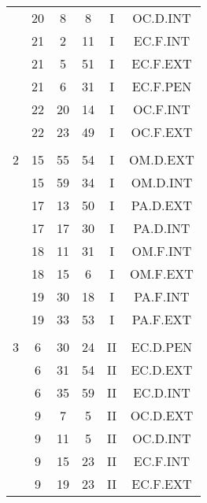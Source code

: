 \documentclass[12pt, a4paper]{article}
\begin{document}
\begin{multicols}{3}
{\begin{tabular}{c c c c c c}
	 	 	 	 & 20 & 8 & 8 & I & OC.D.INT\\%
	 	 	 	 & 21 & 2 & 11 & I & EC.F.INT\\%
	 	 	 	 & 21 & 5 & 51 & I & EC.F.EXT\\%
	 	 	 	 & 21 & 6 & 31 & I & EC.F.PEN\\%
	 	 	 	 & 22 & 20 & 14 & I & OC.F.INT\\%
	 	 	 	 & 22 & 23 & 49 & I & OC.F.EXT\\%
	 	 	 	 & & & & & \\%
	 	 	 	2 & 15 & 55 & 54 & I & OM.D.EXT\\%
	 	 	 	 & 15 & 59 & 34 & I & OM.D.INT\\%
	 	 	 	 & 17 & 13 & 50 & I & PA.D.EXT\\%
	 	 	 	 & 17 & 17 & 30 & I & PA.D.INT\\%
	 	 	 	 & 18 & 11 & 31 & I & OM.F.INT\\%
	 	 	 	 & 18 & 15 & 6 & I & OM.F.EXT\\%
	 	 	 	 & 19 & 30 & 18 & I & PA.F.INT\\%
	 	 	 	 & 19 & 33 & 53 & I & PA.F.EXT\\%
	 	 	 	 & & & & & \\%
	 	 	 	3 & 6 & 30 & 24 & II & EC.D.PEN\\%
	 	 	 	 & 6 & 31 & 54 & II & EC.D.EXT\\%
	 	 	 	 & 6 & 35 & 59 & II & EC.D.INT\\%
	 	 	 	 & 9 & 7 & 5 & II & OC.D.EXT\\%
	 	 	 	 & 9 & 11 & 5 & II & OC.D.INT\\%
	 	 	 	 & 9 & 15 & 23 & II & EC.F.INT\\%
	 	 	 	 & 9 & 19 & 23 & II & EC.F.EXT\\%

\end{tabular}}
\end{multicols}
\end{document}
